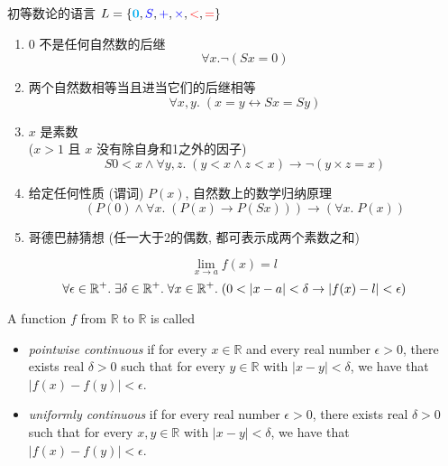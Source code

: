 \begin{frame}{}
  \begin{center}
    初等数论的语言 $L = \{\textbf{\textcolor{cyan}{0}},
      \textcolor{blue}{S}, \textcolor{blue}{+}, \textcolor{blue}{\times}, \textcolor{red}{<}, \textcolor{red}{=}\}$
  \end{center}

  \begin{enumerate}[<+->][(1)]
    \setlength{\itemsep}{5pt}
    \item 0 不是任何自然数的后继
      \[
        \forall x. \lnot (Sx = 0)
      \]
    \item 两个自然数相等当且进当它们的后继相等
      \[
        \forall x, y.\; (x = y \leftrightarrow Sx = Sy)
      \]
    \item $x$ 是素数 \\
      ($x > 1$ 且 $x$ 没有除自身和1之外的因子)
      \[
        S0 < x \land \forall y, z.\; (y < x \land z < x) \to \lnot (y \times z = x)
      \]
    \item 给定任何性质 (谓词) $P(x)$, 自然数上的数学归纳原理
      \[
        (P(0) \land \forall x.\; (P(x) \to P(Sx))) \to (\forall x.\; P(x))
      \]
    \item 哥德巴赫猜想 (任一大于2的偶数, 都可表示成两个素数之和)
  \end{enumerate}
\end{frame}

\begin{frame}{}
  \[
    \lim_{x \to a} f(x) = l
  \]
  \[
    \forall \epsilon \in \mathbb{R}^{+}.\; \exists \delta \in \mathbb{R}^{+}.\;
      \forall x \in \mathbb{R}^{+}.\; (0 < |x - a| < \delta \to |f(x) - l| < \epsilon)
  \]
\end{frame}

\begin{frame}{}
  A function $f$ from $\mathbb{R}$ to $\mathbb{R}$ is called
  \begin{itemize}
    \item \emph{pointwise continuous} if
      for every $x \in \mathbb{R}$
      and every real number $\epsilon > 0$,
      there exists real $\delta > 0$ such that
      for every $y \in \mathbb{R}$ with $|x - y| < \delta$,
      we have that $|f(x) -  f(y)|< \epsilon$.
    \item \emph{uniformly continuous} if
      for every real number $\epsilon > 0$,
      there exists real $\delta > 0$ such that
      for every $x, y \in \mathbb{R}$ with $|x - y| < \delta$,
      we have that $|f(x) -  f(y)|< \epsilon$.
  \end{itemize}
\end{frame}

\begin{frame}{}
\end{frame}
